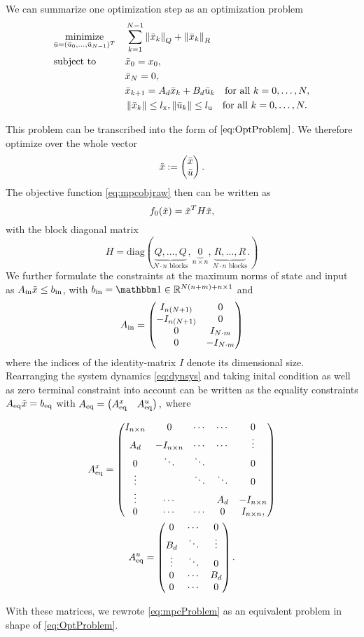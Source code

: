 We can summarize one optimization step as an optimization problem
\begin{equation}
	\begin{aligned} \label{eq:mpcProblem}
	& \underset{\bar{u}=(\bar{u}_0,\dots,\bar{u}_{N-1})^T}{\text{minimize}}
	& & \sum_{k = 1}^{N-1} \left\lVert\bar{x}_k\right\rVert_Q + \left\lVert\bar{x}_k\right\rVert_R\\
	& \text{subject to}
	& & \bar{x}_0 = x_0,\\
	& & &\bar{x}_N = 0,\\
	& & &\bar{x}_{k+1} = A_d \bar{x}_k + B_d \bar{u}_k \text{\quad for all } k = 0,\dots,N,\\
	& & &\left\lVert\bar{x}_k\right\rVert \leq {l}_{\mathrm{x}}, \left\lVert\bar{u}_k\right\rVert \leq {l}_{\mathrm{u}} \text{\quad for all } k = 0,\dots,N.
	\end{aligned}
\end{equation}


This problem can be transcribed into the form of $ \eqref{eq:OptProblem} $. We therefore optimize over the whole vector \[ \tilde{x} := \begin{pmatrix} {\bar{x}} \\ {\bar{u}} \end{pmatrix}. \] The objective function \eqref{eq:mpcobjraw} then can  be written as
\[ f_0(\tilde{x}) = \tilde{x} ^T  H \tilde{x}, \] with  the block diagonal matrix \[ H = \mathrm{diag}(\underbrace{Q,\dots,Q}_{N\cdot n \text{ blocks}},\underbrace{0}_{n \times n},\underbrace{R,\dots,R}_{N \cdot n \text{ blocks}}.) \]
We further formulate the constraints at the maximum norms of state and input as $ {A}_{\mathrm{{ in}}} \tilde{x} \leq {b}_{\mathrm{{ in}}} $, with $ \bineq = \ones \in \R^{N(n+m)+n \times 1} $ and
\[ {A}_{\mathrm{{ in}}} = \begin{pmatrix}
I_{n(N+1)} & 0\\
-I_{n(N+1)} & 0\\
0 & I_{N\cdot m}\\
0 & -I_{N\cdot m}
\end{pmatrix}\]
where the indices of the identity-matrix $ I $ denote its dimensional size.
Rearranging the system dynamics \eqref{eq:dynsys} and taking inital condition as well as zero terminal constraint into account can be written as the equality constraints $ {A}_{\mathrm{eq}} \tilde{x} = {b}_{\mathrm{eq}} $ with
$ {A}_{\mathrm{eq}} =   \left( {A}_{\mathrm{eq}}^x \quad {A}_{\mathrm{eq}}^u \right), $ where

\begin{gather*}
	{A}_{\mathrm{eq}}^x =  \begin{pmatrix}
	I_{n\times n} & 0 & \cdots & \cdots & 0\\
	A_d & -I_{n\times n} & \cdots & \cdots & \vdots\\
	0 & \ddots & \ddots &  &  0\\
	\vdots & & \ddots  & \ddots & 0\\
	\vdots & \cdots & & A_d & -I_{n\times n}\\
	0 &\cdots& \cdots & 0& I_{n\times n},
	\end{pmatrix}\\
	{A}_{\mathrm{eq}}^u = \begin{pmatrix}
	0 & \cdots & 0\\
	B_d &\ddots &\vdots\\
	\vdots &\ddots & 0\\
	0 & \cdots & B_d\\
	0 & \cdots & 0
	\end{pmatrix}.
\end{gather*}

With these matrices, we rewrote \eqref{eq:mpcProblem} as an equivalent problem in shape of  \eqref{eq:OptProblem}.